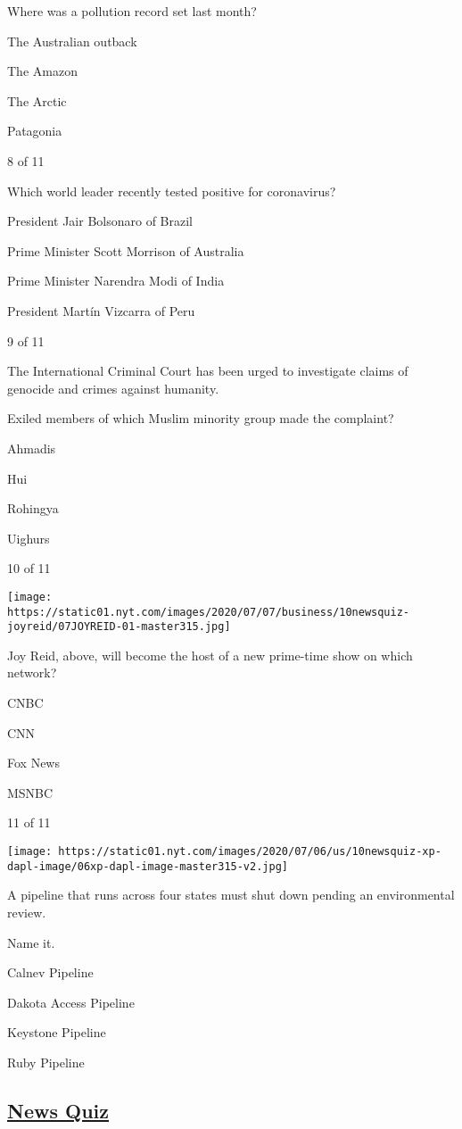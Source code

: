 Where was a pollution record set last month?

The Australian outback

The Amazon

The Arctic

Patagonia

8 of 11

Which world leader recently tested positive for coronavirus?

President Jair Bolsonaro of Brazil

Prime Minister Scott Morrison of Australia

Prime Minister Narendra Modi of India

President Martín Vizcarra of Peru

9 of 11

The International Criminal Court has been urged to investigate claims of
genocide and crimes against humanity.

Exiled members of which Muslim minority group made the complaint?

Ahmadis

Hui

Rohingya

Uighurs

10 of 11

\texttt{[image: https://static01.nyt.com/images/2020/07/07/business/10newsquiz-joyreid/07JOYREID-01-master315.jpg]}

Joy Reid, above, will become the host of a new prime-time show on which
network?

CNBC

CNN

Fox News

MSNBC

11 of 11

\texttt{[image: https://static01.nyt.com/images/2020/07/06/us/10newsquiz-xp-dapl-image/06xp-dapl-image-master315-v2.jpg]}

A pipeline that runs across four states must shut down pending an
environmental review.

Name it.

Calnev Pipeline

Dakota Access Pipeline

Keystone Pipeline

Ruby Pipeline

\hypertarget{news-quiz}{%
\subsection{\texorpdfstring{\href{https://www.nytimes.com/spotlight/news-quiz}{News
Quiz}}{News Quiz}}\label{news-quiz}}

